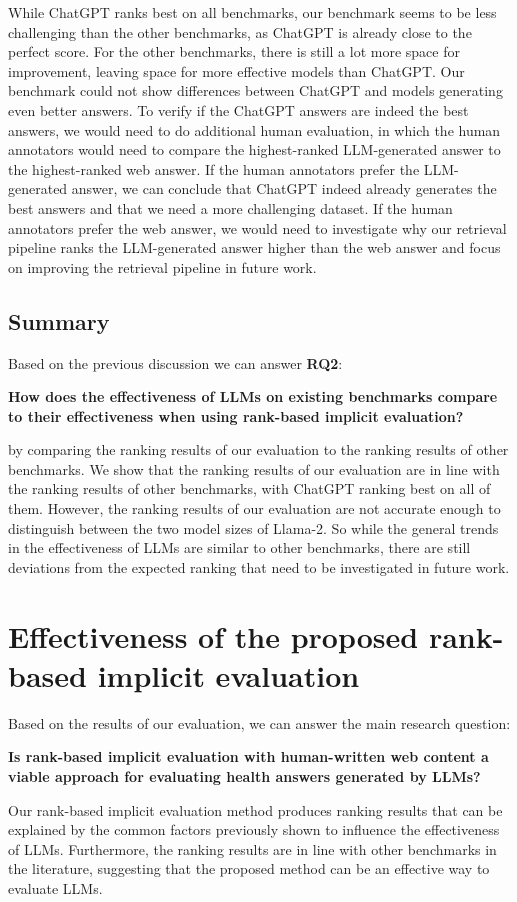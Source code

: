 While ChatGPT ranks best on all benchmarks, our benchmark seems to be less challenging than the other benchmarks, as ChatGPT is already close to the perfect score.
For the other benchmarks, there is still a lot more space for improvement, leaving space for more effective models than ChatGPT.
Our benchmark could not show differences between ChatGPT and models generating even better answers.
To verify if the ChatGPT answers are indeed the best answers, we would need to do additional human evaluation, in which the human annotators would need to compare the highest-ranked LLM-generated answer to the highest-ranked web answer.
If the human annotators prefer the LLM-generated answer, we can conclude that ChatGPT indeed already generates the best answers and that we need a more challenging dataset.
If the human annotators prefer the web answer, we would need to investigate why our retrieval pipeline ranks the LLM-generated answer higher than the web answer and focus on improving the retrieval pipeline in future work.

\subsection{Summary}
Based on the previous discussion we can answer \textbf{RQ2}:
\begin{center}
    \textbf{How does the effectiveness of LLMs on existing benchmarks compare to their effectiveness when using rank-based implicit evaluation?}
\end{center}
by comparing the ranking results of our evaluation to the ranking results of other benchmarks.
We show that the ranking results of our evaluation are in line with the ranking results of other benchmarks, with ChatGPT ranking best on all of them.
However, the ranking results of our evaluation are not accurate enough to distinguish between the two model sizes of Llama-2.
So while the general trends in the effectiveness of LLMs are similar to other benchmarks, there are still deviations from the expected ranking that need to be investigated in future work.
\newpage
\section{Effectiveness of the proposed rank-based implicit evaluation}
Based on the results of our evaluation, we can answer the main research question:
\begin{center}
    \textbf{Is rank-based implicit evaluation with human-written web content a viable approach for evaluating health answers generated by LLMs?}
\end{center}
Our rank-based implicit evaluation method produces ranking results that can be explained by the common factors previously shown to influence the effectiveness of LLMs.
Furthermore, the ranking results are in line with other benchmarks in the literature, suggesting that the proposed method can be an effective way to evaluate LLMs.

